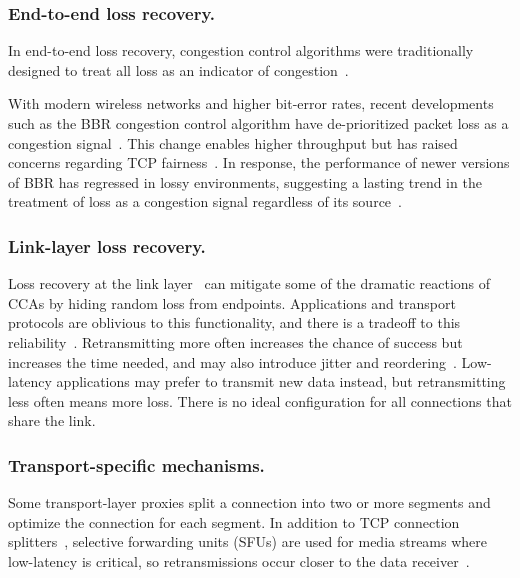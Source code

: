 \subsubsection{End-to-end loss recovery.}

In end-to-end loss recovery,
congestion control algorithms were traditionally designed to treat all loss as an indicator of
congestion~\cite{rfc5681tcp,rfc2001tcp}.

With modern wireless networks and higher bit-error rates, recent developments
such as the BBR congestion control
algorithm have de-prioritized packet loss as a congestion
signal~\cite{cardwell2017bbr}. This change enables higher throughput but has
raised concerns regarding TCP fairness~\cite
{ware2019modeling,philip2024prudentia}. In response, the performance of newer
versions of BBR has regressed in lossy environments, suggesting a lasting trend
in the treatment of loss as a congestion signal regardless of its source~\cite
{yuan2025internet}.

\subsubsection{Link-layer loss recovery.}

Loss recovery at the link layer~\cite{3gpp5gstandard,le2022link,ieee80211e} can
mitigate some of the dramatic reactions of CCAs by hiding random loss from
endpoints.
Applications and transport protocols are oblivious to this
functionality, and there is a tradeoff to this reliability~\cite{klingler2018impact,kliazovich2012arqproxy}.
Retransmitting more often increases the chance
of success but increases the time needed, and may also introduce
jitter and reordering~\cite{leung2007overview}.
Low-latency applications may prefer to transmit new data instead, but
retransmitting less often means more loss.
There is no ideal configuration for all connections that share the link.

\subsubsection{Transport-specific mechanisms.}

Some transport-layer proxies split a connection into two or more segments
and optimize the connection for each segment. In addition to
TCP connection splitters~\cite{rfc3135,honda2011still,hayes2019mmwave},
selective forwarding units (SFUs) are
used for media streams where low-latency is critical, so retransmissions occur
closer to the data receiver~\cite{rfc7667,andre2018comparative}.

